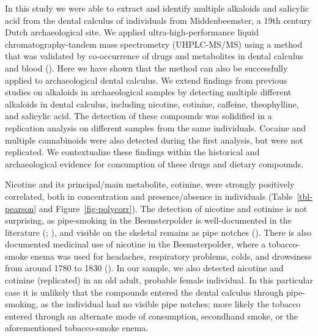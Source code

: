 \documentclass[
  b5paper,
]{book}
\begin{document}
In this study we were able to extract and identify multiple alkaloids
and salicylic acid from the dental calculus of individuals from
Middenbeemster, a 19th century Dutch archaeological site. We applied
ultra-high-performance liquid chromatography-tandem mass spectrometry
(UHPLC-MS/MS) using a method that was validated by co-occurrence of
drugs and metabolites in dental calculus and blood
(). Here
we have shown that the method can also be successfully applied to
archaeological dental calculus. We extend findings from previous studies
on alkaloids in archaeological samples by detecting multiple different
alkaloids in dental calculus, including nicotine, cotinine, caffeine,
theophylline, and salicylic acid. The detection of these compounds was
solidified in a replication analysis on different samples from the same
individuals. Cocaine and multiple cannabinoids were also detected during
the first analysis, but were not replicated. We contextualize these
findings within the historical and archaeological evidence for
consumption of these drugs and dietary compounds.

Nicotine and its principal/main metabolite, cotinine, were strongly
positively correlated, both in concentration and presence/absence in
individuals (Table~\ref{tbl-pearson} and Figure~\ref{fig-polycorr}). The
detection of nicotine and cotinine is not surprising, as pipe-smoking in
the Beemsterpolder is well-documented in the literature
(;
), and visible on the
skeletal remains as pipe notches
(). There
is also documented medicinal use of nicotine in the Beemsterpolder,
where a tobacco-smoke enema was used for headaches, respiratory
problems, colds, and drowsiness from around 1780 to 1830
(). In our sample, we
also detected nicotine and cotinine (replicated) in an old adult,
probable female individual. In this particular case it is unlikely that
the compounds entered the dental calculus through pipe-smoking, as the
individual had no visible pipe notches; more likely the tobacco entered
through an alternate mode of consumption, secondhand smoke, or the
aforementioned tobacco-smoke enema.
\end{document}
